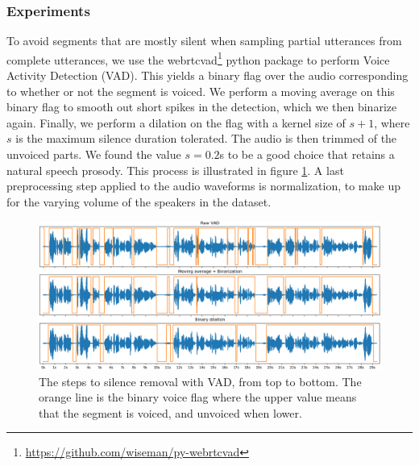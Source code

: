 \documentclass[a4paper, oneside, 12pt, english]{article}
\begin{document}
\subsubsection{Experiments}
To avoid segments that are mostly silent when sampling partial utterances from complete utterances, we use the webrtcvad\footnote{\url{https://github.com/wiseman/py-webrtcvad}} python package to perform Voice Activity Detection (VAD). This yields a binary flag over the audio corresponding to whether or not the segment is voiced. We perform a moving average on this binary flag to smooth out short spikes in the detection, which we then binarize again. Finally, we perform a dilation on the flag with a kernel size of $s + 1$, where $s$ is the maximum silence duration tolerated. The audio is then trimmed of the unvoiced parts. We found the value $s=0.2$s to be a good choice that retains a natural speech prosody. This process is illustrated in figure \ref{encoder_preprocess_vad}. A last preprocessing step applied to the audio waveforms is normalization, to make up for the varying volume of the speakers in the dataset.

\begin{figure}[h]
	\centering
	\includegraphics[width=\linewidth]{images/encoder_preprocess_vad.png}
	\caption{The steps to silence removal with VAD, from top to bottom. The orange line is the binary voice flag where the upper value means that the segment is voiced, and unvoiced when lower.}
	\label{encoder_preprocess_vad}
\end{figure}
\end{document}
